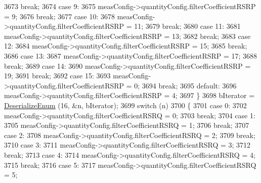 \begin{DoxyCode}
3673               \textcolor{keywordflow}{break};
3674             \textcolor{keywordflow}{case} 9:
3675               measConfig->quantityConfig.filterCoefficientRSRP = 9;
3676               \textcolor{keywordflow}{break};
3677             \textcolor{keywordflow}{case} 10:
3678               measConfig->quantityConfig.filterCoefficientRSRP = 11;
3679               \textcolor{keywordflow}{break};
3680             \textcolor{keywordflow}{case} 11:
3681               measConfig->quantityConfig.filterCoefficientRSRP = 13;
3682               \textcolor{keywordflow}{break};
3683             \textcolor{keywordflow}{case} 12:
3684               measConfig->quantityConfig.filterCoefficientRSRP = 15;
3685               \textcolor{keywordflow}{break};
3686             \textcolor{keywordflow}{case} 13:
3687               measConfig->quantityConfig.filterCoefficientRSRP = 17;
3688               \textcolor{keywordflow}{break};
3689             \textcolor{keywordflow}{case} 14:
3690               measConfig->quantityConfig.filterCoefficientRSRP = 19;
3691               \textcolor{keywordflow}{break};
3692             \textcolor{keywordflow}{case} 15:
3693               measConfig->quantityConfig.filterCoefficientRSRP = 0;
3694               \textcolor{keywordflow}{break};
3695             \textcolor{keywordflow}{default}:
3696               measConfig->quantityConfig.filterCoefficientRSRP = 4;
3697             \}
3698           bIterator = \hyperlink{classns3_1_1Asn1Header_a4fcc253e0eec3483c775b005c1875f2d}{DeserializeEnum} (16, &n, bIterator);
3699           \textcolor{keywordflow}{switch} (n)
3700             \{
3701             \textcolor{keywordflow}{case} 0:
3702               measConfig->quantityConfig.filterCoefficientRSRQ = 0;
3703               \textcolor{keywordflow}{break};
3704             \textcolor{keywordflow}{case} 1:
3705               measConfig->quantityConfig.filterCoefficientRSRQ = 1;
3706               \textcolor{keywordflow}{break};
3707             \textcolor{keywordflow}{case} 2:
3708               measConfig->quantityConfig.filterCoefficientRSRQ = 2;
3709               \textcolor{keywordflow}{break};
3710             \textcolor{keywordflow}{case} 3:
3711               measConfig->quantityConfig.filterCoefficientRSRQ = 3;
3712               \textcolor{keywordflow}{break};
3713             \textcolor{keywordflow}{case} 4:
3714               measConfig->quantityConfig.filterCoefficientRSRQ = 4;
3715               \textcolor{keywordflow}{break};
3716             \textcolor{keywordflow}{case} 5:
3717               measConfig->quantityConfig.filterCoefficientRSRQ = 5;

\end{DoxyCode}

